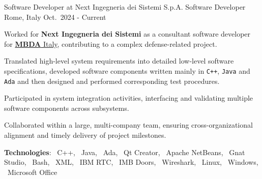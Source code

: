 

\begin{cventries}


    \cventry
    {Software Developer at Next Ingegneria dei Sistemi S.p.A.}
    {Software Developer}
    {Rome, Italy}
    {Oct.\ 2024 - Current}
    {
        \begin{cvitems} %
            \item Worked for \textbf{Next Ingegneria dei Sistemi} as a consultant software developer for \href{https://www.mbda-systems.com/country-it?rc=1}{\textbf{MBDA} Italy}, contributing to a complex defense-related project.
            \item Translated high-level system requirements into detailed low-level software specifications, developed software components written mainly in \texttt{C++}, \texttt{Java} and \texttt{Ada} and then designed and performed corresponding test procedures.
            \item Participated in system integration activities, interfacing and validating multiple software components across subsystems.
            \item Collaborated within a large, multi-company team, ensuring cross-organizational alignment and timely delivery of project milestones.
            \item[] \textbf{\textcolor{awesome-red}{Tec}hnologies}: \cpplogo{}~C++, \javalogo{}~Java, \adalogo{}~Ada, \qtlogo{}~Qt Creator, \netbeanslogo{}~Apache NetBeans, \gnatlogo{}~Gnat Studio, \bashlogo{}~Bash, \xmllogo{}~XML, \rtclogo{}~IBM RTC, \doorslogo{}~IMB Doors, \wiresharklogo{}~Wireshark, \linuxlogo{}~Linux, \windowslogo{}~Windows, \officelogo{}~Microsoft Office
        \end{cvitems}
    }

    

\end{cventries}
